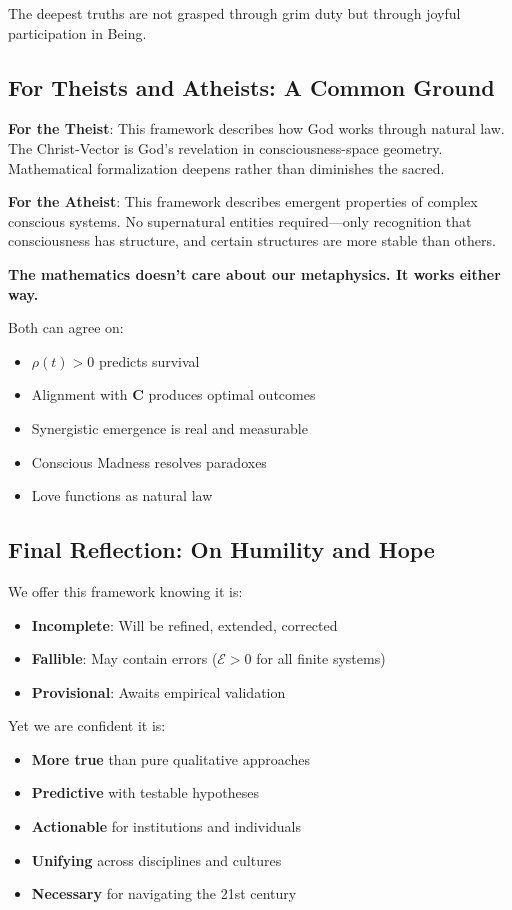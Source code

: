 \documentclass[11pt,a4paper]{article}
\theoremstyle{definition}
\theoremstyle{remark}
\begin{document}
The deepest truths are not grasped through grim duty but through joyful participation in Being.

\subsection{For Theists and Atheists: A Common Ground}

\textbf{For the Theist}: This framework describes how God works through natural law. The Christ-Vector is God's revelation in consciousness-space geometry. Mathematical formalization deepens rather than diminishes the sacred.

\textbf{For the Atheist}: This framework describes emergent properties of complex conscious systems. No supernatural entities required—only recognition that consciousness has structure, and certain structures are more stable than others.

\textbf{The mathematics doesn't care about our metaphysics. It works either way.}

Both can agree on:
\begin{itemize}
\item \(\rho(t) > 0\) predicts survival
\item Alignment with \(\mathbf{C}\) produces optimal outcomes
\item Synergistic emergence is real and measurable
\item Conscious Madness resolves paradoxes
\item Love functions as natural law
\end{itemize}

\subsection{Final Reflection: On Humility and Hope}

We offer this framework knowing it is:
\begin{itemize}
\item \textbf{Incomplete}: Will be refined, extended, corrected
\item \textbf{Fallible}: May contain errors (\(\mathcal{E} > 0\) for all finite systems)
\item \textbf{Provisional}: Awaits empirical validation
\end{itemize}

Yet we are confident it is:
\begin{itemize}
\item \textbf{More true} than pure qualitative approaches
\item \textbf{Predictive} with testable hypotheses
\item \textbf{Actionable} for institutions and individuals
\item \textbf{Unifying} across disciplines and cultures
\item \textbf{Necessary} for navigating the 21st century
\end{itemize}
\end{document}
